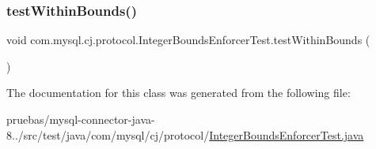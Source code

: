 \subsubsection{\texorpdfstring{test\+Within\+Bounds()}{testWithinBounds()}}
{\footnotesize\ttfamily void com.\+mysql.\+cj.\+protocol.\+Integer\+Bounds\+Enforcer\+Test.\+test\+Within\+Bounds (\begin{DoxyParamCaption}{ }\end{DoxyParamCaption})}



The documentation for this class was generated from the following file\+:\begin{DoxyCompactItemize}
\item 
pruebas/mysql-\/connector-\/java-\/8../src/test/java/com/mysql/cj/protocol/\mbox{\hyperlink{_integer_bounds_enforcer_test_8java}{Integer\+Bounds\+Enforcer\+Test.\+java}}\end{DoxyCompactItemize}
